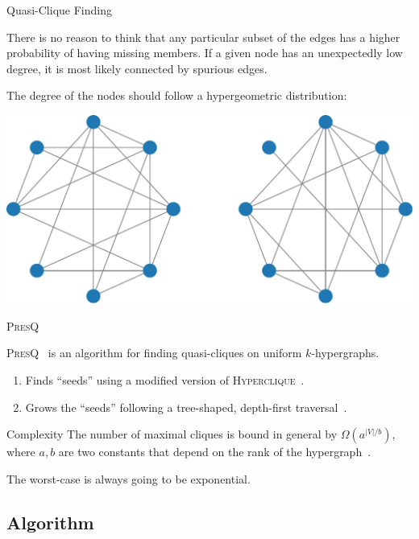 \documentclass[10pt]{beamer}
\newcommand{\PresQ}[0]{\textsc{PresQ}\xspace}
\begin{document}
\begin{frame}{Quasi-Clique Finding}
    \begin{block}{}
    There is no reason to think that any particular subset of the edges
    has a higher probability of having missing members. If a given node has an
    unexpectedly low degree, it is most likely connected by spurious edges.
    
    The degree of the nodes should follow a hypergeometric distribution:
    \end{block}
    \centering
    \includegraphics[width=0.7\linewidth]{quasicliques}
\end{frame}

\begin{frame}{\PresQ}

    \begin{block}{}
    \PresQ~\cite{AlvarezAyllonPresQ2022} is an algorithm for finding quasi-cliques on uniform
    $k$-hypergraphs.
    
    \begin{enumerate}
        \item Finds ``seeds'' using a modified version of \textsc{Hyperclique}~\cite{koeller2003discovery}.
        \item Grows the ``seeds'' following a tree-shaped, depth-first
        traversal~\cite{uno_efficient_2010}.
    \end{enumerate}
    \end{block}
    
    \begin{alertblock}{Complexity}
        \smallskip
        The number of maximal cliques is bound in general by $\Omega(a^{|V|/b})$,
        where $a, b$ are two constants that depend on the rank of the hypergraph~\cite{Tomescu1981}.
        
        The worst-case is always going to be exponential.
    \end{alertblock}
\end{frame}

\subsection{Algorithm}
\end{document}
